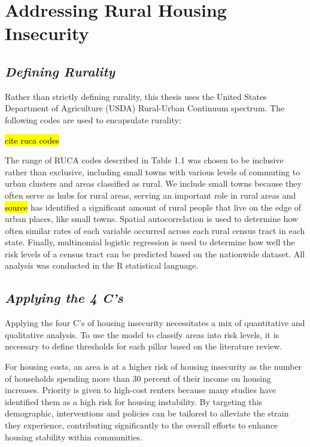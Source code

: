 \chapter{Addressing Rural Housing Insecurity}	%

\section{\textit{Defining Rurality}}
Rather than strictly defining rurality, this thesis uses the United States Department of Agriculture (USDA) Rural-Urban Continuum spectrum. The following codes are used to encapsulate rurality:


\hl{cite ruca codes}

The range of RUCA codes described in Table 1.1 was chosen to be inclusive rather than exclusive, including small towns with various levels of commuting to urban clusters and areas classified as rural. We include small towns because they often serve as hubs for rural areas, serving an important role in rural areas and \hl{source} has identified a significant amount of rural people that live on the edge of urban places, like small towns. Spatial autocorrelation is used to determine how often similar rates of each variable occurred across each rural census tract in each state. Finally, multinomial logistic regression is used to determine how well the risk levels of a census tract can be predicted based on the nationwide dataset.  All analysis was conducted in the R statistical language.  

\section{\textit{Applying the 4 C's}}
Applying the four C's of housing insecurity necessitates a mix of quantitative and qualitative analysis. To use the model to classify areas into risk levels, it is necessary to define thresholds for each pillar based on the literature review. 

For housing costs, an area is at a higher risk of housing insecurity as the number of households spending more than 30 percent of their income on housing increases. Priority is given to high-cost renters because many studies have identified them as a high risk for housing instability. By targeting this demographic, interventions and policies can be tailored to alleviate the strain they experience, contributing significantly to the overall efforts to enhance housing stability within communities.

